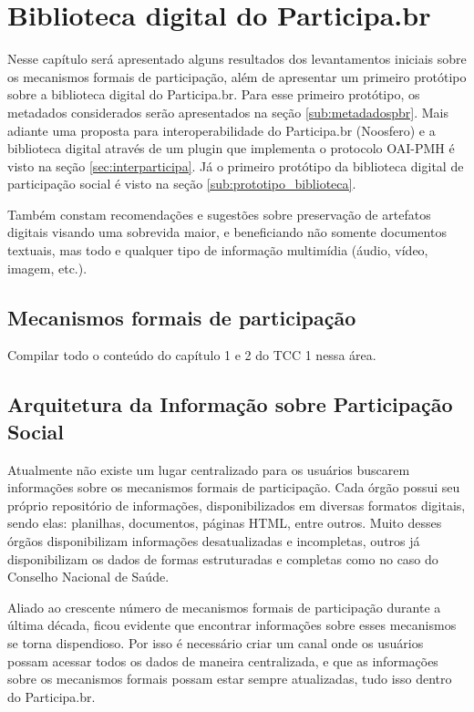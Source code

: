 
\chapter{Biblioteca digital do Participa.br}
\label{cap:bibparticipabr}

Nesse capítulo será apresentado alguns resultados dos levantamentos iniciais sobre os mecanismos formais de participação, além de apresentar um primeiro protótipo sobre a biblioteca digital do Participa.br. Para esse primeiro protótipo, os metadados considerados serão apresentados na seção \ref{sub:metadadospbr}. Mais adiante uma proposta para interoperabilidade do Participa.br (Noosfero) e a biblioteca digital através de um plugin que implementa o protocolo OAI-PMH é visto na seção \ref{sec:interparticipa}. Já o primeiro protótipo da biblioteca digital de participação social é visto na seção \ref{sub:prototipo_biblioteca}.

Também constam recomendações e sugestões sobre preservação de artefatos digitais visando uma sobrevida maior, e beneficiando não somente documentos textuais, mas todo e qualquer tipo de informação multimídia (áudio, vídeo, imagem, etc.).

\section{Mecanismos formais de participação}

Compilar todo o conteúdo do capítulo 1 e 2 do TCC 1 nessa área.

\section{Arquitetura da Informação sobre Participação Social}

Atualmente não existe um lugar centralizado para os usuários buscarem informações sobre os mecanismos formais de participação. Cada órgão possui seu próprio repositório de informações, disponibilizados em diversas formatos digitais, sendo elas: planilhas, documentos, páginas HTML, entre outros. Muito desses órgãos disponibilizam informações desatualizadas e incompletas, outros já disponibilizam os dados de formas estruturadas e completas como no caso do Conselho Nacional de Saúde. 

Aliado ao crescente número de mecanismos formais de participação durante a última década, ficou evidente que encontrar informações sobre esses mecanismos se torna dispendioso. Por isso é necessário criar um canal onde os usuários possam acessar todos os dados de maneira centralizada, e que as informações sobre os mecanismos formais possam estar sempre atualizadas, tudo isso dentro do Participa.br.

